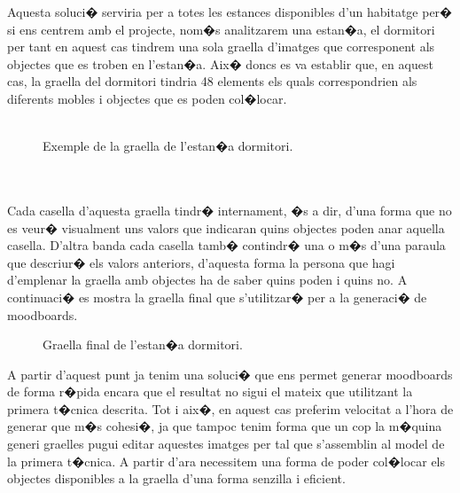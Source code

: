 \documentclass[12pt,a4paper,openright,oneside]{article}
\numberwithin{equation}{section}
\theoremstyle{definition}
\begin{document}
Aquesta soluci� serviria per a totes les estances disponibles d'un habitatge per� si ens centrem amb el projecte, nom�s analitzarem una estan�a, el dormitori per tant en aquest cas tindrem una sola graella d'imatges que corresponent als objectes que es troben en l'estan�a. Aix� doncs es va establir que, en aquest cas, la graella del dormitori tindria 48 elements els quals correspondrien als diferents mobles i objectes que es poden col�locar.\\\
\begin{figure}[h!]
\begin{center}
\caption{Exemple de la graella de l'estan�a dormitori.}
\end{center}
\end{figure}
\\\\
Cada casella d'aquesta graella tindr� internament, �s a dir, d'una forma que no es veur� visualment uns valors que indicaran quins objectes poden anar aquella casella. D'altra banda cada casella tamb� contindr� una o m�s d'una paraula que descriur� els valors anteriors, d'aquesta forma la persona que hagi d'emplenar la graella amb objectes ha de saber quins poden i quins no. A continuaci� es mostra la graella final que s'utilitzar� per a la generaci� de moodboards.
\newpage
\begin{figure}[h!]
\begin{center}
\caption{Graella final de l'estan�a dormitori.}
\end{center}
\end{figure}
A partir d'aquest punt ja tenim una soluci� que ens permet generar moodboards de forma r�pida encara que el resultat no sigui el mateix que utilitzant la primera t�cnica descrita. Tot i aix�, en aquest cas preferim velocitat a l'hora de generar que m�s cohesi�, ja que tampoc tenim forma que un cop la m�quina generi graelles pugui editar aquestes imatges per tal que s'assemblin al model de la primera t�cnica. A partir d'ara necessitem una forma de poder col�locar els objectes disponibles a la graella d'una forma senzilla i eficient.\\\
\newpage
\end{document}
